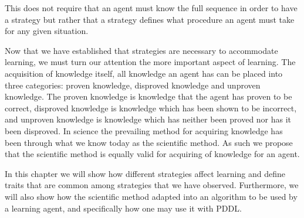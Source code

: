 \documentclass[../Master.tex]{subfiles}
\begin{document}
	This does not require that an agent must know the full sequence in order to have a strategy but rather that a strategy defines what procedure an agent must take for any given situation.

	Now that we have established that strategies are necessary to accommodate learning, we must turn our attention the more important aspect of learning. 
	The acquisition of knowledge itself, all knowledge an agent has can be placed into three categories: proven knowledge, disproved knowledge and unproven knowledge. 
	The proven knowledge is knowledge that the agent has proven to be correct, disproved knowledge is knowledge which has been shown to be incorrect, and unproven knowledge is knowledge which has neither been proved nor has it been disproved.
	In science the prevailing method for acquiring knowledge has been through what we know today as the scientific method. 
	As such we propose that the scientific method is equally valid for acquiring of knowledge for an agent.
	
	In this chapter we will show how different strategies affect learning and define traits that are common among strategies that we have observed. 
	Furthermore, we will also show how the scientific method adapted into an algorithm to be used by a learning agent, and specifically how one may use it with PDDL.
	
	
	
\end{document}
